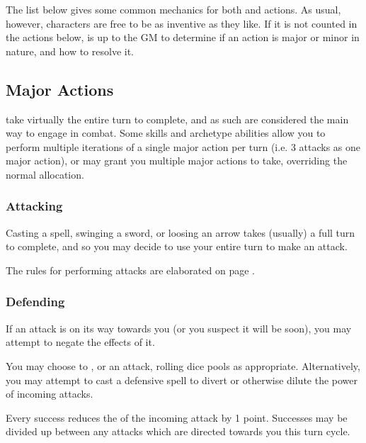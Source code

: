  The list below gives some common mechanics for both  and  actions. As usual, however, characters are free to be as inventive as they like. If it is not counted in the actions below, is up to the GM to determine if an action is major or minor in nature, and how to resolve it. 
 
 \subsection{Major Actions}
 
  take virtually the entire turn to complete, and as such are considered the main way to engage in combat. Some skills and archetype abilities allow you to perform multiple iterations of a single major action per turn (i.e. 3 attacks as one major action), or may grant you multiple major actions to take, overriding the normal allocation. 
 
 \subsubsection{Attacking}
 
 Casting a spell, swinging a sword, or loosing an arrow takes (usually) a full turn to complete, and so you may decide to use your entire turn to make an attack.
 
The rules for performing attacks are elaborated on page \pageref{S:Attacks}.


	\subsubsection{Defending}    
	
	If an attack is on its way towards you (or you suspect it will be soon), you may attempt to negate the effects of it. 
	
	You may choose to ,  or  an attack, rolling dice pools as appropriate. Alternatively, you may attempt to cast a defensive spell to divert or otherwise dilute the power of incoming attacks. 
	
	Every success reduces the  of the incoming attack by 1 point. Successes may be divided up between any attacks which are directed towards you this turn cycle. 
	
